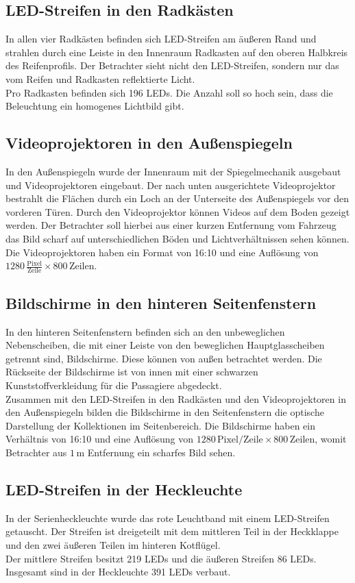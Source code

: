 \subsection{LED-Streifen in den Radkästen}
In allen vier Radkästen befinden sich LED-Streifen am äußeren Rand und strahlen durch eine Leiste in den Innenraum Radkasten auf den oberen Halbkreis des Reifenprofils. Der Betrachter sieht nicht den LED-Streifen, sondern nur das vom Reifen und Radkasten reflektierte Licht. \\
Pro Radkasten befinden sich 196 LEDs. Die Anzahl soll so hoch sein, dass die Beleuchtung ein homogenes Lichtbild gibt.
\subsection{Videoprojektoren in den Außenspiegeln}
In den Außenspiegeln wurde der Innenraum mit der Spiegelmechanik ausgebaut und Videoprojektoren eingebaut. Der nach unten ausgerichtete Videoprojektor bestrahlt die Flächen durch ein Loch an der Unterseite des Außenspiegels vor den vorderen Türen.
Durch den Videoprojektor können Videos auf dem Boden gezeigt werden. Der Betrachter soll hierbei aus einer kurzen Entfernung vom Fahrzeug das Bild scharf auf unterschiedlichen Böden und Lichtverhältnissen sehen können. \\
Die Videoprojektoren haben ein Format von 16:10 und eine Auflösung von $ 1280\,\frac{\mathrm{Pixel}}{\mathrm{Zeile}} \times 800\,\mathrm{Zeilen} $.
\subsection{Bildschirme in den hinteren Seitenfenstern}
In den hinteren Seitenfenstern befinden sich an den unbeweglichen Nebenscheiben, die mit einer Leiste von den beweglichen Hauptglasscheiben getrennt sind, Bildschirme. Diese können von außen betrachtet werden. Die Rückseite der Bildschirme ist von innen mit einer schwarzen Kunststoffverkleidung für die Passagiere abgedeckt.\\
Zusammen mit den LED-Streifen in den Radkästen und den Videoprojektoren in den Außenspiegeln bilden die Bildschirme in den Seitenfenstern die optische Darstellung der Kollektionen im Seitenbereich.
Die Bildschirme haben ein Verhältnis von 16:10 und eine Auflösung von $ 1280\,\mathrm{Pixel}/\mathrm{Zeile} \times 800 \,\mathrm{Zeilen} $, womit Betrachter aus $ 1\,\mathrm{m} $ Entfernung ein scharfes Bild sehen.
\subsection{LED-Streifen in der Heckleuchte}
In der Serienheckleuchte wurde das rote Leuchtband mit einem LED-Streifen getauscht. Der Streifen ist dreigeteilt mit dem mittleren Teil in der Heckklappe und den zwei äußeren Teilen im hinteren Kotflügel. \\
Der mittlere Streifen besitzt 219 LEDs und die äußeren Streifen 86 LEDs. Insgesamt sind in der Heckleuchte 391 LEDs verbaut.
